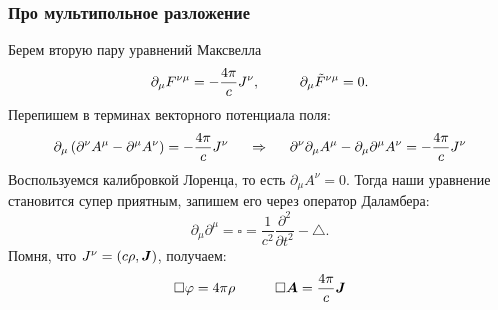 \subsubsection{Про мультипольное разложение}
Берем вторую пару уравнений Максвелла
\begin{equation*}
	\partial_\mu F^{\nu \mu} = - \frac{4 \pi }{c} J^\nu,
	\hspace{1 cm}
	\partial_\mu \tilde{F}^{\nu\mu} = 0.
\end{equation*}
Перепишем в терминах векторного потенциала поля:
\begin{equation*}
	\partial_\mu \left(\partial^\nu A^\mu - \partial^\mu A^\nu\right) = -\frac{4 \pi}{c} J^\nu
	\hspace{0.5 cm}
	\Rightarrow
	\hspace{0.5 cm}
	\partial^\nu \partial_\mu  A^\mu - \partial_\mu \partial^\mu A^\nu = -\frac{4 \pi}{c} J^\nu
\end{equation*}
Воспользуемся калибровкой Лоренца, то есть $\partial_\mu A^\nu = 0$. Тогда наши уравнение становится супер приятным, запишем его через оператор Даламбера:
\begin{equation*}
 	\partial_\mu \partial^\mu = \square = \frac{1}{c^2}\frac{\partial^2}{\partial t^2} - \triangle.
 \end{equation*} 
 Помня, что $J^\nu = (c \rho, \mbox{\boldmath $J$})$, получаем:
 \begin{equation*}
 	\square \varphi = 4 \pi \rho
 	\hspace{1 cm}
 	\square \mbox{\boldmath $A$} = \frac{4 \pi}{c} \mbox{\boldmath $J$}
 \end{equation*}


